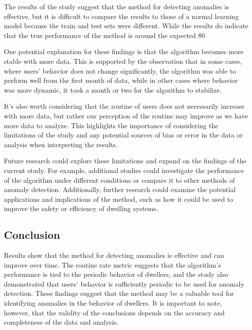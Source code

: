 The results of the study suggest that the method for detecting anomalies is effective, but it is difficult to compare the results to those of a normal learning model because the train and test sets were different. While the results do indicate that the true performance of the method is around the expected 80%

One potential explanation for these findings is that the algorithm becomes more stable with more data. This is supported by the observation that in some cases, where users' behavior does not change significantly, the algorithm was able to perform well from the first month of data, while in other cases where behavior was more dynamic, it took a month or two for the algorithm to stabilize.

It's also worth considering that the routine of users does not necessarily increase with more data, but rather our perception of the routine may improve as we have more data to analyze. This highlights the importance of considering the limitations of the study and any potential sources of bias or error in the data or analysis when interpreting the results.

Future research could explore these limitations and expand on the findings of the current study. For example, additional studies could investigate the performance of the algorithm under different conditions or compare it to other methods of anomaly detection. Additionally, further research could examine the potential applications and implications of the method, such as how it could be used to improve the safety or efficiency of dwelling systems.

\subsection{Conclusion}

Results show that the method for detecting anomalies is effective and can improve over time.
The routine rate metric suggests that the algorithm's performance is tied to the periodic behavior of dwellers,
and the study also demonstrated that users' behavior is sufficiently periodic to be used for anomaly detection.
These findings suggest that the method may be a valuable tool for identifying anomalies in the behavior of dwellers.
It is important to note, however, that the validity of the conclusions depends on the accuracy and completeness of the data and analysis.



